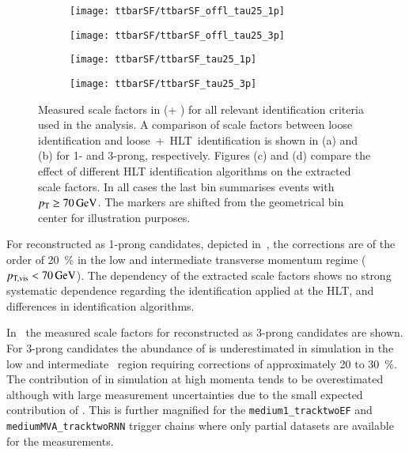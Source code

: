 \begin{figure}[htbp]
  \centering

  \begin{subfigure}[t]{.495\textwidth}
    \texttt{[image: ttbarSF/ttbarSF\_offl\_tau25\_1p]}
    \caption{}
    \label{fig:ttbarSF_postfit_SF_a}
  \end{subfigure}\hfill%
  \begin{subfigure}[t]{.495\textwidth}
    \texttt{[image: ttbarSF/ttbarSF\_offl\_tau25\_3p]}
    \caption{}
    \label{fig:ttbarSF_postfit_SF_b}
  \end{subfigure}

  \begin{subfigure}[t]{.495\textwidth}
    \texttt{[image: ttbarSF/ttbarSF\_tau25\_1p]}
    \caption{}
    \label{fig:ttbarSF_postfit_SF_c}
  \end{subfigure}\hfill%
  \begin{subfigure}[t]{.495\textwidth}
    \texttt{[image: ttbarSF/ttbarSF\_tau25\_3p]}
    \caption{}
    \label{fig:ttbarSF_postfit_SF_d}
  \end{subfigure}

  \caption{Measured \faketauhadvis scale factors in \ttbar
    (\POWHEGBOX[v2] + \PYTHIA[8]) for all relevant \tauhadvis
    identification criteria used in the analysis. A comparison of
    \faketauhadvis scale factors between loose identification and
    loose~+~HLT~identification is shown in (a) and (b) for 1- and
    3-prong, respectively. Figures (c) and (d) compare the effect of
    different HLT identification algorithms on the extracted scale
    factors. In all cases the last bin summarises events with
    \tauhadvis~$\pT \geq \SI{70}{\GeV}$.  The markers are shifted from
    the geometrical bin center for illustration purposes.}
  \label{fig:ttbarSF_postfit_SF}
\end{figure}

For \faketauhadvis reconstructed as 1-prong \tauhadvis candidates,
depicted in~,
the corrections are of the order of \SI{20}{\percent} in the low and
intermediate transverse momentum regime ($\pTvis < \SI{70}{\GeV}$).
The dependency of the extracted scale factors shows no strong
systematic dependence regarding the \tauhadvis identification applied
at the HLT, and differences in identification algorithms.

In~ the
measured scale factors for \faketauhadvis reconstructed as 3-prong
candidates are shown. For 3-prong candidates the abundance of
\faketauhadvis is underestimated in simulation in the low and
intermediate \tauhadvis~\pT region requiring corrections of
approximately \num{20} to \SI{30}{\percent}. The contribution of
\faketauhadvis in simulation at high momenta tends to be overestimated
although with large measurement uncertainties due to the small
expected contribution of \faketauhadvis. This is further magnified for
the \texttt{medium1\_tracktwoEF} and \texttt{mediumMVA\_tracktwoRNN}
trigger chains where only partial datasets are available for the
measurements.

